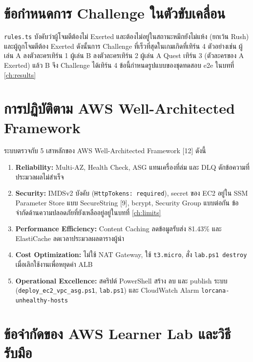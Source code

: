 \section{ข้อกำหนดการ Challenge ในตัวขับเคลื่อน}
\label{sec:challenge}

\texttt{rules.ts} บังคับว่าผู้โจมตีต้องไม่ Exerted และต้องไม่อยู่ในสถานะหมึกยังไม่แห้ง (ยกเว้น Rush) และผู้ถูกโจมตีต้อง Exerted ดังนั้นการ Challenge ที่เร็วที่สุดในเกมเกิดที่เทิร์น 4 ตัวอย่างเช่น ผู้เล่น A ลงตัวละครเทิร์น 1 ผู้เล่น B ลงตัวละครเทิร์น 2 ผู้เล่น A Quest เทิร์น 3 (ตัวละครของ A Exerted) แล้ว B จึง Challenge ได้เทิร์น 4 ข้อนี้กำหนดรูปแบบของชุดทดสอบ e2e ในบทที่ \ref{ch:results}

\section{การปฏิบัติตาม AWS Well-Architected Framework}

ระบบตรวจกับ 5 เสาหลักของ AWS Well-Architected Framework [12] ดังนี้

\begin{enumerate}
    \item \textbf{Reliability:} Multi-AZ, Health Check, ASG แทนเครื่องที่ล่ม และ DLQ ดักข้อความที่ประมวลผลไม่สำเร็จ
    \item \textbf{Security:} IMDSv2 บังคับ (\texttt{HttpTokens: required}), secret ของ EC2 อยู่ใน SSM Parameter Store แบบ SecureString [9], bcrypt, Security Group แบบต่อกัน ข้อจำกัดด้านความปลอดภัยที่ยังเหลืออยู่อยู่ในบทที่ \ref{ch:limits}
    \item \textbf{Performance Efficiency:} Content Caching ลดข้อมูลรับส่ง 81.43\% และ ElastiCache ลดเวลาประมวลผลตารางผู้นำ
    \item \textbf{Cost Optimization:} ไม่ใช้ NAT Gateway, ใช้ \texttt{t3.micro}, สั่ง \texttt{lab.ps1 destroy} เมื่อเลิกใช้งานเพื่อหยุดค่า ALB
    \item \textbf{Operational Excellence:} สคริปต์ PowerShell สร้าง ลบ และ publish ระบบ (\texttt{deploy\_ec2\_vpc\_asg.ps1}, \texttt{lab.ps1}) และ CloudWatch Alarm \texttt{lorcana-unhealthy-hosts}
\end{enumerate}

\section{ข้อจำกัดของ AWS Learner Lab และวิธีรับมือ}

